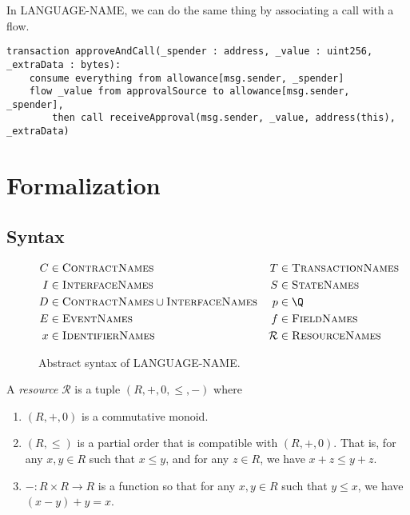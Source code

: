 \documentclass[10pt]{article}
\newcommand{\langName}{LANGUAGE-NAME\xspace}
\begin{document}
In \langName, we can do the same thing by associating a call with a flow.
\begin{lstlisting}
transaction approveAndCall(_spender : address, _value : uint256, _extraData : bytes):
    consume everything from allowance[msg.sender, _spender]
    flow _value from approvalSource to allowance[msg.sender, _spender],
        then call receiveApproval(msg.sender, _value, address(this), _extraData)
\end{lstlisting}

\section{Formalization}

\subsection{Syntax}
\begin{figure}[ht]
\begin{align*}
    C &\in \textsc{ContractNames} & T &\in \textsc{TransactionNames} \\
    I &\in \textsc{InterfaceNames} & S &\in \textsc{StateNames}\\
    D &\in \textsc{ContractNames} \cup \textsc{InterfaceNames} & p &\in \Q \\
    E &\in \textsc{EventNames} & f &\in \textsc{FieldNames} \\
    x &\in \textsc{IdentifierNames} & \mathcal{R} &\in \textsc{ResourceNames} \\
\end{align*}
\caption{Abstract syntax of \langName.}
\label{lang-syntax}
\end{figure}

\begin{definition}
    A \emph{resource} $\mathcal{R}$ is a tuple $(R, +, 0, \leq, -)$ where
    \begin{enumerate}[label=(\roman*)]
        \item $(R, +, 0)$ is a commutative monoid.
        \item $(R, \leq)$ is a partial order that is compatible with $(R, +, 0)$.
            That is, for any $x, y \in R$ such that $x \leq y$, and for any $z \in R$, we have $x + z \leq y + z$.
        \item $- : R \times R \to R$ is a function so that for any $x,y \in R$ such that $y \leq x$, we have $(x - y) + y = x$.
    \end{enumerate}
\end{definition}
\end{document}
